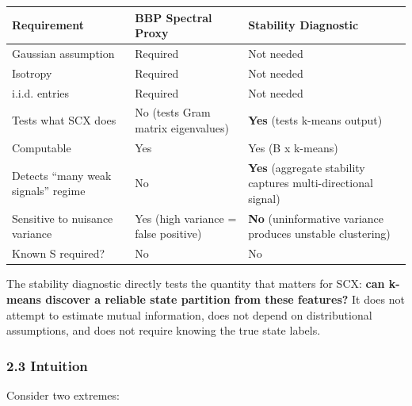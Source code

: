 \documentclass[
  12pt,
]{ctexart}
\begin{document}
\begin{longtable}[]{@{}
  >{\raggedright\arraybackslash}p{}
  >{\raggedright\arraybackslash}p{}
  >{\raggedright\arraybackslash}p{}@{}}
\toprule\noalign{}
\begin{minipage}[b]{\linewidth}\raggedright
Requirement
\end{minipage} & \begin{minipage}[b]{\linewidth}\raggedright
BBP Spectral Proxy
\end{minipage} & \begin{minipage}[b]{\linewidth}\raggedright
Stability Diagnostic
\end{minipage} \\
\midrule\noalign{}
\endhead
\bottomrule\noalign{}
\endlastfoot
Gaussian assumption & Required & Not needed \\
Isotropy & Required & Not needed \\
i.i.d. entries & Required & Not needed \\
Tests what SCX does & No (tests Gram matrix eigenvalues) & \textbf{Yes}
(tests k-means output) \\
Computable & Yes & Yes (B x k-means) \\
Detects ``many weak signals'' regime & No & \textbf{Yes} (aggregate
stability captures multi-directional signal) \\
Sensitive to nuisance variance & Yes (high variance = false positive) &
\textbf{No} (uninformative variance produces unstable clustering) \\
Known S required? & No & No \\
\end{longtable}

The stability diagnostic directly tests the quantity that matters for
SCX: \textbf{can k-means discover a reliable state partition from these
features?} It does not attempt to estimate mutual information, does not
depend on distributional assumptions, and does not require knowing the
true state labels.

\subsubsection{2.3 Intuition}\label{intuition}

Consider two extremes:
\end{document}
